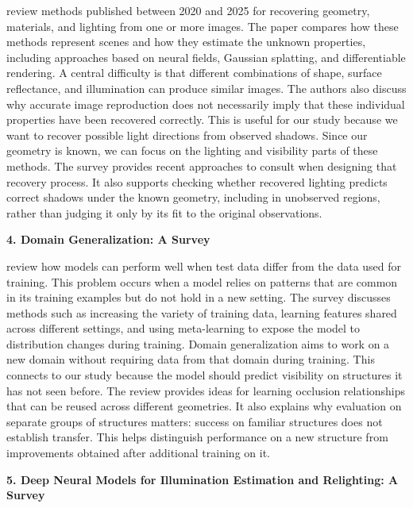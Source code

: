 \documentclass[11pt,letterpaper]{article}
\newcommand{\reviewtitle}[1]{\par\Needspace{10\baselineskip}\vspace{7pt}\textbf{#1}\par}
\begin{document}
\citet{ullah2026inverserendering} review methods published between 2020 and 2025 for recovering geometry, materials, and lighting from one or more images. The paper compares how these methods represent scenes and how they estimate the unknown properties, including approaches based on neural fields, Gaussian splatting, and differentiable rendering. A central difficulty is that different combinations of shape, surface reflectance, and illumination can produce similar images. The authors also discuss why accurate image reproduction does not necessarily imply that these individual properties have been recovered correctly. This is useful for our study because we want to recover possible light directions from observed shadows. Since our geometry is known, we can focus on the lighting and visibility parts of these methods. The survey provides recent approaches to consult when designing that recovery process. It also supports checking whether recovered lighting predicts correct shadows under the known geometry, including in unobserved regions, rather than judging it only by its fit to the original observations.

\reviewtitle{4. Domain Generalization: A Survey}

\citet{zhou2023domaingeneralization} review how models can perform well when test data differ from the data used for training. This problem occurs when a model relies on patterns that are common in its training examples but do not hold in a new setting. The survey discusses methods such as increasing the variety of training data, learning features shared across different settings, and using meta-learning to expose the model to distribution changes during training. Domain generalization aims to work on a new domain without requiring data from that domain during training. This connects to our study because the model should predict visibility on structures it has not seen before. The review provides ideas for learning occlusion relationships that can be reused across different geometries. It also explains why evaluation on separate groups of structures matters: success on familiar structures does not establish transfer. This helps distinguish performance on a new structure from improvements obtained after additional training on it.

\reviewtitle{5. Deep Neural Models for Illumination Estimation and Relighting: A Survey}
\end{document}
